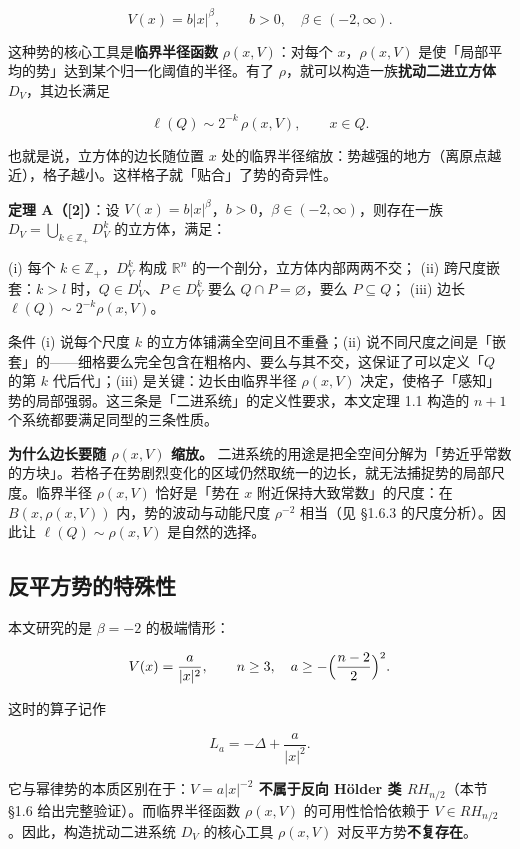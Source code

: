 \documentclass[a4paper,11pt,openany]{ctexbook}
\numberwithin{equation}{chapter}
\numberwithin{figure}{chapter}
\numberwithin{table}{chapter}
\begin{document}
$$V(x)=b|x|^\beta,\qquad b>0,\quad \beta\in(-2,\infty).$$

这种势的核心工具是\textbf{临界半径函数} $\rho(x,V)$：对每个 $x$，$\rho(x,V)$ 是使「局部平均的势」达到某个归一化阈值的半径。有了 $\rho$，就可以构造一族\textbf{扰动二进立方体} $D_V$，其边长满足

$$\ell(Q)\sim 2^{-k}\,\rho(x,V),\qquad x\in Q.$$

也就是说，立方体的边长随位置 $x$ 处的临界半径缩放：势越强的地方（离原点越近），格子越小。这样格子就「贴合」了势的奇异性。

\textbf{定理 A（[2]）}：设 $V(x)=b|x|^\beta$，$b>0$，$\beta\in(-2,\infty)$，则存在一族 $D_V=\bigcup_{k\in\mathbb Z_+}D_V^k$ 的立方体，满足：

(i) 每个 $k\in\mathbb Z_+$，$D_V^k$ 构成 $\mathbb R^n$ 的一个剖分，立方体内部两两不交；
(ii) 跨尺度嵌套：$k>l$ 时，$Q\in D_V^l$、$P\in D_V^k$ 要么 $Q\cap P=\varnothing$，要么 $P\subseteq Q$；
(iii) 边长 $\ell(Q)\sim 2^{-k}\rho(x,V)$。

\begin{intuitionbox}
条件 (i) 说每个尺度 $k$ 的立方体铺满全空间且不重叠；(ii) 说不同尺度之间是「嵌套」的——细格要么完全包含在粗格内、要么与其不交，这保证了可以定义「$Q$ 的第 $k$ 代后代」；(iii) 是关键：边长由临界半径 $\rho(x,V)$ 决定，使格子「感知」势的局部强弱。这三条是「二进系统」的定义性要求，本文定理 1.1 构造的 $n+1$ 个系统都要满足同型的三条性质。
\end{intuitionbox}

\textbf{为什么边长要随 $\rho(x,V)$ 缩放。} 二进系统的用途是把全空间分解为「势近乎常数的方块」。若格子在势剧烈变化的区域仍然取统一的边长，就无法捕捉势的局部尺度。临界半径 $\rho(x,V)$ 恰好是「势在 $x$ 附近保持大致常数」的尺度：在 $B(x,\rho(x,V))$ 内，势的波动与动能尺度 $\rho^{-2}$ 相当（见 §1.6.3 的尺度分析）。因此让 $\ell(Q)\sim\rho(x,V)$ 是自然的选择。

\subsection{反平方势的特殊性}

本文研究的是 $\beta=-2$ 的极端情形：

$$V(x)=\frac{a}{|x|^2},\qquad n\ge 3,\quad a\ge-\Bigl(\frac{n-2}{2}\Bigr)^2.$$

这时的算子记作

$$L_a = -\Delta + \frac{a}{|x|^2}.$$

它与幂律势的本质区别在于：\textbf{$V=a|x|^{-2}$ 不属于反向 Hölder 类 $RH_{n/2}$}（本节 §1.6 给出完整验证）。而临界半径函数 $\rho(x,V)$ 的可用性恰恰依赖于 $V\in RH_{n/2}$。因此，构造扰动二进系统 $D_V$ 的核心工具 $\rho(x,V)$ 对反平方势\textbf{不复存在}。
\end{document}

